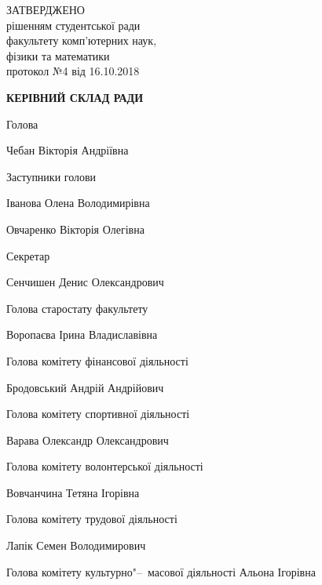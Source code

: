 \documentclass[
	a4paper,
	12pt,
	oneside,
]{extreport}
\begin{document}
\par\noindent
\begin{minipage}[t]{80mm}
	\begin{minipage}[t]{\textwidth}

	\end{minipage}
	\par	
	\begin{minipage}[t]{\textwidth}

	\end{minipage}
\end{minipage}
\hfill
\begin{minipage}[t]{80mm}
	\par\noindent ЗАТВЕРДЖЕНО\\
рішенням студентської ради\\
факультету комп'ютерних наук,\\
фізики та математики\\
протокол №4 від 16.10.2018
\end{minipage}

\begin{center}\textbf{\Large КЕРІВНИЙ СКЛАД РАДИ}\end{center}

{\Large

\par\noindent Голова
\par Чебан Вікторія Андріївна

\par\noindent Заступники голови
\par Іванова Олена Володимирівна
\par Овчаренко Вікторія Олегівна

\par\noindent Секретар
\par Сенчишен Денис Олександрович

\bigskip\bigskip
\par\noindent Голова старостату факультету
\par Воропаєва Ірина Владиславівна
\bigskip\bigskip

\par\noindent Голова комітету фінансової діяльності
\par Бродовський Андрій Андрійович

\par\noindent Голова комітету спортивної діяльності
\par Варава Олександр Олександрович

\par\noindent Голова комітету волонтерської діяльності
\par Вовчанчина Тетяна Ігорівна

\par\noindent Голова комітету трудової діяльності
\par Лапік Семен Володимирович

\par\noindent Голова комітету культурно"--~масової діяльності
 Альона Ігорівна
\par 
}
\end{document}
